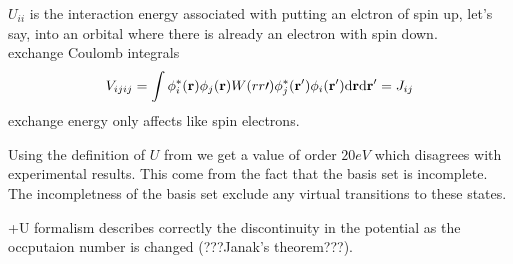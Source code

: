$U_{ii}$ is the interaction energy associated with putting an elctron of spin up, let's say, into an orbital where there is already an electron with spin down.\\
exchange Coulomb integrals
\begin{equation}
V_{ijij}=\int\phi_{i}^{*}({\bf r})\phi_{j}({\bf r})W(rr\prime)\phi_{j}^{*}({\bf r^\prime})\phi_{i}({\bf r^\prime})\text{d}{\bf r}\text{d}{\bf r^\prime}=J_{ij}
\end{equation}
exchange energy only affects like spin electrons.
\par{Using the definition of $U$ from  we get a value of order $20eV$ which
disagrees with experimental results. This come from the fact that the basis set is incomplete.
The incompletness of the basis set exclude any virtual transitions to these states.}
\par{+U formalism describes correctly the discontinuity in the potential as the occputaion number is changed (???Janak's theorem???).}
